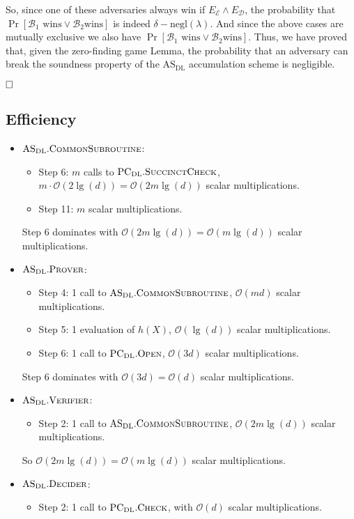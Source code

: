 \documentclass[
]{article}
\providecommand{\tightlist}{%
  \setlength{\itemsep}{0pt}\setlength{\parskip}{0pt}}
\newcommand*\Bc{\mathcal{B}}
\newcommand*\Dc{\mathcal{D}}
\newcommand*\Ec{\mathcal{E}}
\newcommand*\Oc{\mathcal{O}}
\renewcommand*\l{\lambda}
\newcommand{\qed}{\hfill \ensuremath{\Box}}
\newcommand*{\negl}{\text{negl}}
\newcommand*{\PCDL}{\text{PC}_{\text{DL}}}
\newcommand*{\PCDLOpen}{\PCDL.\mathrm{\text{O\scriptsize PEN}}}
\newcommand*{\PCDLSuccinctCheck}{\PCDL.\mathrm{\text{S{\scriptsize UCCINCT}C{\scriptsize HECK}}}}
\newcommand*{\PCDLCheck}{\PCDL.\mathrm{\text{C\scriptsize HECK}}}
\newcommand*{\ASDL}{\text{AS}_{\text{DL}}}
\newcommand*{\ASDLCommonSubroutine}{\ASDL.\mathrm{\text{C{\scriptsize OMMON}S{\scriptsize UBROUTINE}}}}
\newcommand*{\ASDLProver}{\ASDL.\mathrm{\text{P\scriptsize ROVER}}}
\newcommand*{\ASDLVerifier}{\ASDL.\mathrm{\text{V\scriptsize ERIFIER}}}
\newcommand*{\ASDLDecider}{\ASDL.\mathrm{\text{D\scriptsize ECIDER}}}
\begin{document}
So, since one of these adversaries always win if \(E_\Ec \land E_\Dc\),
the probability that \(\Pr[\Bc_1 \text{ wins} \lor \Bc_2 \text{wins}]\)
is indeed \(\delta - \negl(\l)\). And since the above cases are mutually
exclusive we also have
\(\Pr[\Bc_1 \text{ wins} \lor \Bc_2 \text{wins}]\). Thus, we have proved
that, given the zero-finding game Lemma, the probability that an
adversary can break the soundness property of the \(\ASDL\) accumulation
scheme is negligible.

\(\qed\)

\subsection{Efficiency}\label{efficiency-1}

\begin{itemize}
\tightlist
\item
  \(\ASDLCommonSubroutine\):

  \begin{itemize}
  \tightlist
  \item
    Step 6: \(m\) calls to \(\PCDLSuccinctCheck\),
    \(m \cdot \Oc(2\lg(d)) = \Oc(2m\lg(d))\) scalar multiplications.
  \item
    Step 11: \(m\) scalar multiplications.
  \end{itemize}

  Step 6 dominates with \(\Oc(2m\lg(d)) = \Oc(m\lg(d))\) scalar
  multiplications.
\item
  \(\ASDLProver\):

  \begin{itemize}
  \tightlist
  \item
    Step 4: 1 call to \(\ASDLCommonSubroutine\), \(\Oc(md)\) scalar
    multiplications.
  \item
    Step 5: 1 evaluation of \(h(X)\), \(\Oc(\lg(d))\) scalar
    multiplications.
  \item
    Step 6: 1 call to \(\PCDLOpen\), \(\Oc(3d)\) scalar multiplications.
  \end{itemize}

  Step 6 dominates with \(\Oc(3d) = \Oc(d)\) scalar multiplications.
\item
  \(\ASDLVerifier\):

  \begin{itemize}
  \tightlist
  \item
    Step 2: 1 call to \(\ASDLCommonSubroutine\), \(\Oc(2m\lg(d))\)
    scalar multiplications.
  \end{itemize}

  So \(\Oc(2m\lg(d)) = \Oc(m\lg(d))\) scalar multiplications.
\item
  \(\ASDLDecider\):

  \begin{itemize}
  \tightlist
  \item
    Step 2: 1 call to \(\PCDLCheck\), with \(\Oc(d)\) scalar
    multiplications.
  \end{itemize}
\end{itemize}
\end{document}
